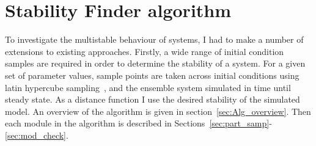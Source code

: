 % 
%
%
\section{Stability Finder algorithm}

To investigate the multistable behaviour of systems, I had to make a number of extensions to existing approaches. Firstly, a wide range of initial condition samples are required in order to determine the stability of a system. For a given set of parameter values, sample points are taken across initial conditions using latin hypercube sampling~\autocite{MCKAY:2000vt}, and the ensemble system simulated in time until steady state. As a distance function I use the desired stability of the simulated model. An overview of the algorithm is given in section~\ref{sec:Alg_overview}. Then each module in the algorithm is described in Sections~\ref{sec:part_samp}-\ref{sec:mod_check}.


